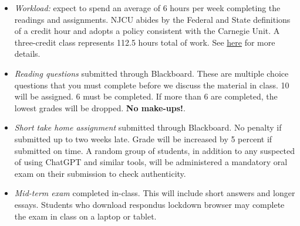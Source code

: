 \documentclass[article,oneside]{memoir}
\begin{document}
\begin{itemize}


\item \textit{Workload:} expect to spend an average of 6 hours per week completing the readings and assignments. NJCU abides by the Federal and State definitions of a credit hour and adopts a policy consistent with the Carnegie Unit. A three-credit class represents 112.5 hours total of work. See \href{http://scottoconnor.org/resources/Credit.pdf}{here} for more details.




\item \textit{Reading questions} submitted through Blackboard. These are multiple choice questions that you must complete before we discuss the material in class. 10 will be assigned. 6 must be completed. If more than 6 are completed, the lowest grades will be dropped. \textbf{No make-ups!}.



\item \textit{Short take home assignment} submitted through Blackboard. No penalty if submitted up to two weeks late. Grade will be increased by 5 percent if submitted on time. A random group of students, in addition to any suspected of using ChatGPT and similar tools, will be administered a mandatory oral exam on their submission to check authenticity.  

\item \textit{Mid-term exam} completed in-class. This will include short answers and longer essays. Students who download respondus lockdown browser may complete the exam in class on a laptop or tablet. 




\end{itemize}
\end{document}
